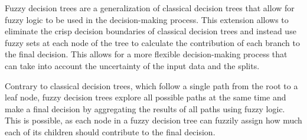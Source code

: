 Fuzzy decision trees are a generalization of classical decision trees that allow for fuzzy logic to be used in the decision-making process. This extension allows to eliminate the crisp decision boundaries of classical decision trees and instead use fuzzy sets at each node of the tree to calculate the contribution of each branch to the final decision. This allows for a more flexible decision-making process that can take into account the uncertainty of the input data and the splits.

Contrary to classical decision trees, which follow a single path from the root to a leaf node, fuzzy decision trees explore all possible paths at the same time and make a final decision by aggregating the results of all paths using fuzzy logic. This is possible, as each node in a fuzzy decision tree can fuzzily assign how much each of its children should contribute to the final decision.



\newcommand*\calc[1]{%
    \pgfmathparse{#1}%
    \pgfmathprintnumber{\pgfmathresult}%
}
\pgfplotsset{compat=1.18}

\newcommand{\fuzzyTreeNode}[2]{
    \begin{tikzpicture}
        \begin{axis}%
            [
                title = {Split: $#1 \leq #2$},
                width=4.5cm,
                height=3cm,
                axis lines=center,
                xlabel={#1},
                x label style={at={(axis description cs:0.9,-0.1)},anchor=north},
                ylabel=$\mu$,
                y label style={at={(axis description cs:0.5,1)},anchor=south},
                xmin=-5,
                xmax=5,
                xtick={},
                xticklabels= {},
                ytick={},
                yticklabels={},
                extra x ticks={0},
                extra x tick labels={#2},
                ymax=1,
                samples=50,
                extra y ticks={1},
                every axis plot/.append style={thick}
            ]
            \addplot[red]  {sigmoid(x,0,-1)};
            \addplot[blue] {sigmoid(x,0,1)};
            \node[anchor=center, red] at (axis cs:-2.9,0.6) {$\mu_{\text{#1smaller#2}}$};
            \node[anchor=center, blue] at (axis cs:3.1,0.6) {$\mu_{\text{#1greater#2}}$};
        \end{axis}

    \end{tikzpicture}
}

